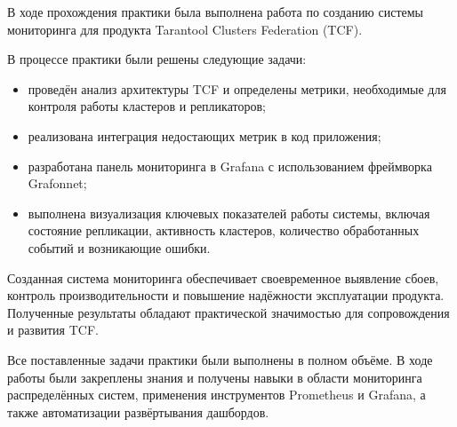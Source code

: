 \conclusion

В ходе прохождения практики была выполнена работа по
созданию системы мониторинга для продукта Tarantool Clusters Federation
(TCF).

В процессе практики были решены следующие задачи:

\begin{itemize}
  \item проведён анализ архитектуры TCF и определены метрики, необходимые для контроля работы кластеров и репликаторов;
  \item реализована интеграция недостающих метрик в код приложения;
  \item разработана панель мониторинга в Grafana с использованием фреймворка Grafonnet;
  \item выполнена визуализация ключевых показателей работы системы, включая состояние репликации,
  активность кластеров, количество обработанных событий и возникающие ошибки.
\end{itemize}

Созданная система мониторинга обеспечивает своевременное выявление сбоев, контроль производительности и
повышение надёжности эксплуатации продукта. Полученные результаты обладают практической значимостью для
сопровождения и развития TCF.

Все поставленные задачи практики были выполнены в полном объёме. В ходе работы были закреплены знания и
получены навыки в области мониторинга распределённых систем, применения инструментов Prometheus и Grafana,
а также автоматизации развёртывания дашбордов.
